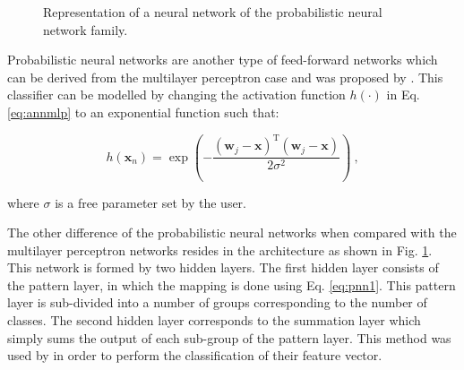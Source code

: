 \begin{enumerate}[leftmargin=*]
\begin{figure}
\caption{Representation of a neural network of the probabilistic neural network family.}
\label{fig:pnn}
\end{figure}

Probabilistic neural networks are another type of feed-forward networks which can be derived from the multilayer perceptron case and was proposed by \cite{Specht1988}. This classifier can be modelled by changing the activation function $h(\cdot)$ in Eq. \eqref{eq:annmlp} to an exponential function such that:

\begin{equation}
	h(\mathbf{x}_n) = \exp \left( - \frac{ (\mathbf{w}_j - \mathbf{x})^{\text{T}}(\mathbf{w}_j - \mathbf{x}) }{2\sigma^2} \right) \ ,
	\label{eq:pnn1}
\end{equation}

\noindent where $\sigma$ is a free parameter set by the user.

The other difference of the probabilistic neural networks when compared with the multilayer perceptron networks resides in the architecture as shown in Fig. \ref{fig:pnn}. This network is formed by two hidden layers. The first hidden layer consists of the pattern layer, in which the mapping is done using Eq. \eqref{eq:pnn1}. This pattern layer is sub-divided into a number of groups corresponding to the number of classes. The second hidden layer corresponds to the summation layer which simply sums the output of each sub-group of the pattern layer. This method was used  by \cite{Ampeliotis2007,Ampeliotis2008,Viswanath2011} in order to perform the classification of their feature vector.


\end{enumerate}
